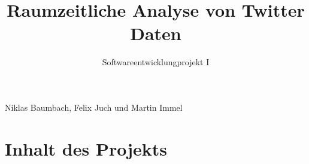 \documentclass[12pt, xcolor={usenames,dvipsnames,svgnames,x11names,table}]{beamer}
\title{Raumzeitliche Analyse von Twitter Daten}
\subtitle{Softwareentwicklungprojekt I}
\date{}
\begin{document}
	\begin{frame}
	 	\titlepage\vspace{-2cm}
	 	\center Niklas Baumbach, Felix Juch und Martin Immel
	\end{frame}	
	
	
	\section{Inhalt des Projekts}

%		
	
\end{document}
